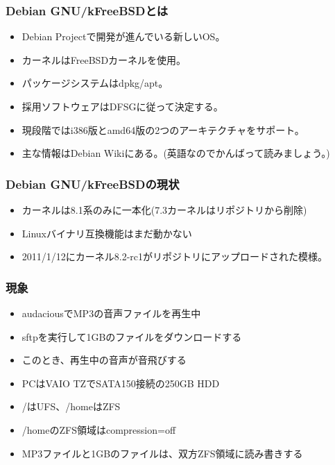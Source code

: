 \documentclass[cjk,dvipdfmx,12pt,%
hyperref={bookmarks=true,bookmarksnumbered=true,bookmarksopen=false,%
colorlinks=false,%
pdftitle={Debian GNU/kFreeBSD で便利に暮らすための Tips},%
pdfauthor={杉本典充},%
pdfsubject={第43回関西Debian勉強会},%
}]{beamer}
\begin{document}
\begin{frame}[fragile]
\frametitle{Debian GNU/kFreeBSDとは}

\begin{itemize}
  \item Debian Projectで開発が進んでいる新しいOS。
  \item カーネルはFreeBSDカーネルを使用。
  \item パッケージシステムはdpkg/apt。
  \item 採用ソフトウェアはDFSGに従って決定する。
  \item 現段階ではi386版とamd64版の2つのアーキテクチャをサポート。
  \item 主な情報はDebian Wikiにある。(英語なのでかんばって読みましょう。)
\end{itemize}
\end{frame}


\begin{frame}[fragile]
\frametitle{Debian GNU/kFreeBSDの現状}
\begin{itemize}
  \item カーネルは8.1系のみに一本化(7.3カーネルはリポジトリから削除)
  \item Linuxバイナリ互換機能はまだ動かない
  \item 2011/1/12にカーネル8.2-rc1がリポジトリにアップロードされた模様。
\end{itemize}
\end{frame}



\begin{frame}[fragile]
\frametitle{現象}
\begin{itemize}
  \item audaciousでMP3の音声ファイルを再生中
  \item sftpを実行して1GBのファイルをダウンロードする
  \item このとき、再生中の音声が音飛びする
\end{itemize}
\begin{itemize}
  \item PCはVAIO TZでSATA150接続の250GB HDD
  \item /はUFS、/homeはZFS
  \item /homeのZFS領域はcompression=off
  \item MP3ファイルと1GBのファイルは、双方ZFS領域に読み書きする
\end{itemize}
\end{frame}
\end{document}
